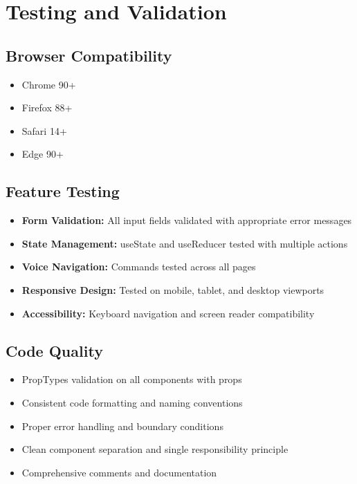 \documentclass[12pt,a4paper]{article}
\begin{document}
\newpage

\section{Testing and Validation}

\subsection{Browser Compatibility}
\begin{itemize}
    \item Chrome 90+
    \item Firefox 88+
    \item Safari 14+
    \item Edge 90+
\end{itemize}

\subsection{Feature Testing}
\begin{itemize}
    \item \textbf{Form Validation:} All input fields validated with appropriate error messages
    \item \textbf{State Management:} useState and useReducer tested with multiple actions
    \item \textbf{Voice Navigation:} Commands tested across all pages
    \item \textbf{Responsive Design:} Tested on mobile, tablet, and desktop viewports
    \item \textbf{Accessibility:} Keyboard navigation and screen reader compatibility
\end{itemize}

\subsection{Code Quality}
\begin{itemize}
    \item PropTypes validation on all components with props
    \item Consistent code formatting and naming conventions
    \item Proper error handling and boundary conditions
    \item Clean component separation and single responsibility principle
    \item Comprehensive comments and documentation
\end{itemize}
\end{document}
